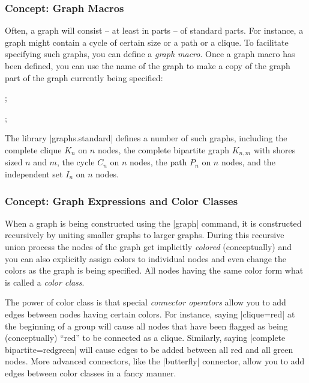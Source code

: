 \subsubsection{Concept: Graph Macros}

Often, a graph will consist -- at least in parts -- of standard
parts. For instance, a graph might contain a cycle of certain size or
a path or a clique. To facilitate specifying such graphs, you can
define a \emph{graph macro}. Once a graph macro has been defined, you
can use the name of the graph to make a copy of the graph part of the
graph currently being specified:

\begin{codeexample}[]
\tikz {};
\end{codeexample}

\begin{codeexample}[]
\tikz {};
\end{codeexample}

The library |graphs.standard| defines a number of such graphs,
including the complete clique $K_n$ on $n$ nodes, the complete
bipartite graph $K_{n,m}$ with shores sized $n$ and $m$, the cycle
$C_n$ on $n$ nodes, the path $P_n$ on $n$ nodes, and the independent
set $I_n$ on $n$ nodes.


\subsubsection{Concept: Graph Expressions and Color Classes}

When a graph is being constructed using the |graph| command, it is
constructed recursively by uniting smaller graphs to larger
graphs. During this recursive union process the nodes
of the graph get implicitly \emph{colored} (conceptually) and you can
also explicitly assign colors to individual nodes and even change the
colors as the graph is being specified. All nodes having the same
color form what is called a \emph{color class}.

The power of color class is that special \emph{connector operators}
allow you to add edges between nodes having certain colors. For instance,
saying |clique=red| at the beginning of a group will
cause all nodes that have been flagged as being (conceptually) ``red''
to be connected as a clique. Similarly, saying
|complete bipartite={red}{green}| will cause edges to be added
between all red and all green nodes. More advanced connectors, like
the |butterfly| connector, allow you to add edges between color
classes in a fancy manner.

